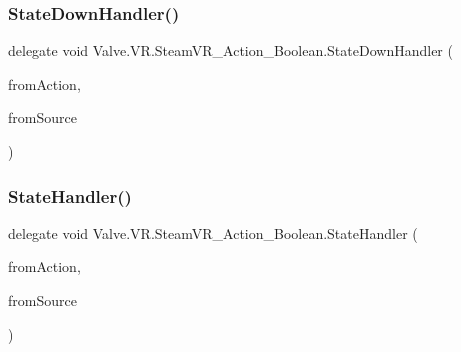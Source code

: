 \subsubsection{\texorpdfstring{StateDownHandler()}{StateDownHandler()}}
{\footnotesize\ttfamily delegate void Valve.\+V\+R.\+Steam\+V\+R\+\_\+\+Action\+\_\+\+Boolean.\+State\+Down\+Handler (\begin{DoxyParamCaption}\item[{\mbox{\hyperlink{class_valve_1_1_v_r_1_1_steam_v_r___action___boolean}{Steam\+V\+R\+\_\+\+Action\+\_\+\+Boolean}}}]{from\+Action,  }\item[{\mbox{\hyperlink{namespace_valve_1_1_v_r_a82e5bf501cc3aa155444ee3f0662853f}{Steam\+V\+R\+\_\+\+Input\+\_\+\+Sources}}}]{from\+Source }\end{DoxyParamCaption})}

\mbox{\label{class_valve_1_1_v_r_1_1_steam_v_r___action___boolean_a59bb3ba4454fcebc2f1d2ddd661dd38f}} 
\subsubsection{\texorpdfstring{StateHandler()}{StateHandler()}}
{\footnotesize\ttfamily delegate void Valve.\+V\+R.\+Steam\+V\+R\+\_\+\+Action\+\_\+\+Boolean.\+State\+Handler (\begin{DoxyParamCaption}\item[{\mbox{\hyperlink{class_valve_1_1_v_r_1_1_steam_v_r___action___boolean}{Steam\+V\+R\+\_\+\+Action\+\_\+\+Boolean}}}]{from\+Action,  }\item[{\mbox{\hyperlink{namespace_valve_1_1_v_r_a82e5bf501cc3aa155444ee3f0662853f}{Steam\+V\+R\+\_\+\+Input\+\_\+\+Sources}}}]{from\+Source }\end{DoxyParamCaption})}

\mbox{\label{class_valve_1_1_v_r_1_1_steam_v_r___action___boolean_a87ebada25dac6016557c3b81e6324b90}} 
